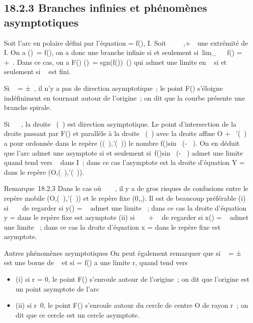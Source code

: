 \documentclass[]{article}
\begin{document}
\subsection{18.2.3 Branches infinies et phénomènes asymptotiques}

Soit \Gamma l'arc en polaire défini par l'équation \rho = f(\theta), \theta \in I. Soit \alpha~ \in
{}~ \cup\-\infty~,+\infty~\ une extrémité de I. On a
\F(\theta)\ =
f(\theta), on a donc une branche infinie si et seulement
si~lim_\theta\rightarrow~\alpha~~f(\theta) =
+\infty~. Dans ce cas, on a  F(\theta) \over
\F(\theta)\
= sgn(f(\theta))\vecu~(\theta) qui
admet une limite en \alpha~ si et seulement si \alpha~ est fini.

Si \alpha~ = ±\infty~, il n'y a pas de direction asymptotique~; le point F(\theta)
s'éloigne indéfiniment en tournant autour de l'origine~; on dit que la
courbe présente une branche spirale.

Si \alpha~ \in {}~, la droite ~\vecu(\alpha~) est direction
asymptotique. Le point d'intersection de la droite passant par F(\theta) et
parallèle à la droite ~\vecu(\alpha~) avec la droite affine
O + \mathbb{R}~\vecu'(\alpha~) a pour ordonnée dans le repère
(\vecu(\alpha~),\vecu'(\alpha~)) le nombre
f(\theta)sin~ (\theta - \alpha~). On en déduit que l'arc admet
une asymptote si et seulement si~f(\theta)sin~ (\theta -
\alpha~) admet une limite \ell quand \theta tend vers \alpha~ dans I~; dans ce cas
l'asymptote est la droite d'équation Y = \ell dans le repère
(O,\vecu(\alpha~),\vecu'(\alpha~)).

Remarque~18.2.3 Dans le cas où \alpha~ \in \pi~  , il y
a de gros risques de confusions entre le repère mobile
(O,\vecu(\alpha~),\vecu'(\alpha~)) et le
repère fixe (0,\vec\imath,). Il
est de beaucoup préférable (i) si \alpha~ \in \pi~ de regarder si y(\theta) =
\rhosin~ \theta admet une limite \ell~; dans ce cas la
droite d'équation y = \ell dans le repère fixe est asymptote (ii) si \alpha~ \in
\pi~ \over 2 + \pi~\mathbb{Z} de regarder si x(\theta) =
\rhocos~ \theta admet une limite \ell~; dans ce cas la
droite d'équation x = \ell dans le repère fixe est asymptote.

Autres phénomènes asymptotiques On peut également remarquer que si \alpha~ =
±\infty~ est une borne de \alpha~ et si \rho = f(\theta) a une limite r, quand \theta tend vers \alpha~

\begin{itemize}
\itemsep1pt\parskip0pt
\item
  (i) si r = 0, le point F(\theta) s'enroule autour de l'origine~; on dit que
  l'origine est un point asymptote de l'arc
\item
  (ii) si r\neq~0, le point F(\theta) s'enroule autour
  du cercle de centre O de rayon r~; on dit que ce
  cercle est un cercle asymptote.
\end{itemize}
\end{document}
